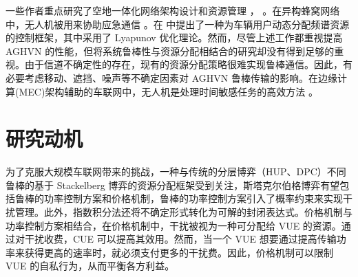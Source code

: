 一些作者重点研究了空地一体化网络架构设计和资源管理 \cite{OUC}， \cite{OSI}。在异构蜂窝网络中，无人机被用来协助应急通信 \cite{DSF}。在 \cite{SDR}中提出了一种为车辆用户动态分配频谱资源的控制框架，其中采用了 Lyapunov 优化理论。然而，尽管上述工作都重视提高 AGHVN 的性能，但将系统鲁棒性与资源分配相结合的研究却没有得到足够的重视。由于信道不确定性的存在，现有的资源分配策略很难实现鲁棒通信。因此，有必要考虑移动、遮挡、噪声等不确定因素对 AGHVN 鲁棒传输的影响。在边缘计算(MEC)架构辅助的车联网中，无人机是处理时间敏感任务的高效方法 \cite{谭国平2024无人机辅助MEC车辆任务卸载与功率控制近端策略优化算法}。

\section{研究动机}\label{section1-3}

为了克服大规模车联网带来的挑战，一种与传统的分层博弈（HUP、DPC）不同鲁棒的基于 Stackelberg 博弈的资源分配框架受到关注，斯塔克尔伯格博弈有望包括鲁棒的功率控制方案和价格机制，鲁棒的功率控制方案引入了概率约束来实现干扰管理。此外，指数积分法还将不确定形式转化为可解的封闭表达式。价格机制与功率控制方案相结合，在价格机制中，干扰被视为一种可分配给 VUE 的资源。通过对干扰收费，CUE 可以提高其效用。然而，当一个 VUE 想要通过提高传输功率来获得更高的速率时，就必须支付更多的干扰费。因此，价格机制可以限制 VUE 的自私行为，从而平衡各方利益。

